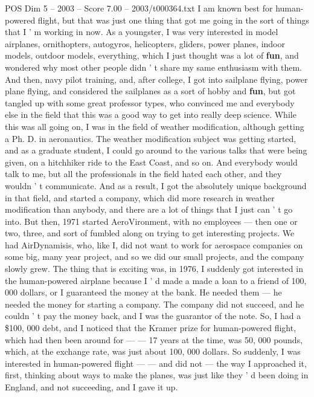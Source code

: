 \begin{textsample}{POS Dim 5 – 2003 – Score 7.00 – 2003/t000364.txt}  \label{ex:f5_pos_024}
I am known best for human-powered flight, but that was just one thing that got me going in the sort of things that I ' m working in now.
As a youngster, I was very interested in model airplanes, ornithopters, autogyros, helicopters, gliders, power planes, indoor models, outdoor models, everything, which I just thought was a lot of \textbf{fun}, and wondered why most other people didn ' t share my same enthusiasm with them.
And then, navy pilot training, and, after college, I got into sailplane flying, power plane flying, and considered the sailplanes as a sort of hobby and \textbf{fun}, but got tangled up with some great professor types, who convinced me and everybody else in the field that this was a good way to get into really deep science.
While this was all going on, I was in the field of weather modification, although getting a Ph.
D. in aeronautics.
The weather modification subject was getting started, and as a graduate student, I could go around to the various talks that were being given, on a hitchhiker ride to the East Coast, and so on.
And everybody would talk to me, but all the professionals in the field hated each other, and they wouldn ' t communicate.
And as a result, I got the absolutely unique background in that field, and started a company, which did more research in weather modification than anybody, and there are a lot of things that I just can ' t go into.
But then, 1971 started AeroVironment, with no employees — then one or two, three, and sort of fumbled along on trying to get interesting projects.
We had AirDynamisis, who, like I, did not want to work for aerospace companies on some big, many year project, and so we did our small projects, and the company slowly grew.
The thing that is exciting was, in 1976, I suddenly got interested in the human-powered airplane because I ' d made a made a loan to a friend of 100, 000 dollars, or I guaranteed the money at the bank.
He needed them — he needed the money for starting a company.
The company did not succeed, and he couldn ' t pay the money back, and I was the guarantor of the note.
So, I had a \$100, 000 debt, and I noticed that the Kramer prize for human-powered flight, which had then been around for — — 17 years at the time, was 50, 000 pounds, which, at the exchange rate, was just about 100, 000 dollars.
So suddenly, I was interested in human-powered flight — — and did not — the way I approached it, first, thinking about ways to make the planes, was just like they ' d been doing in England, and not succeeding, and I gave it up.

\end{textsample}
